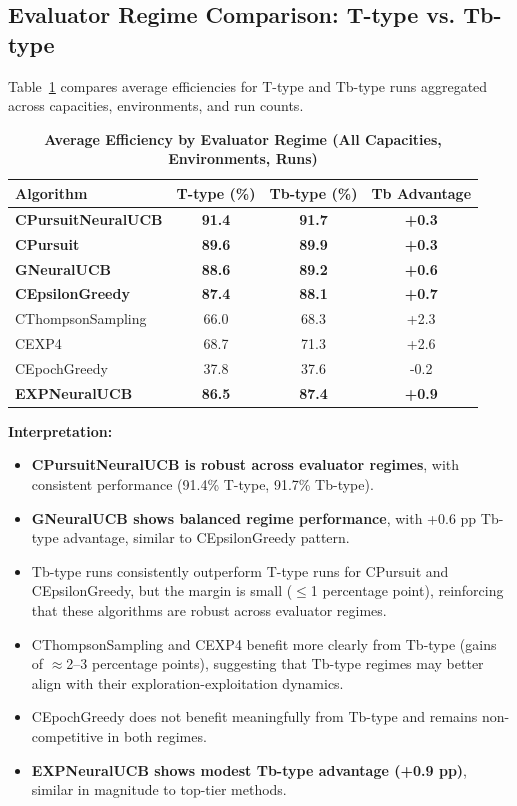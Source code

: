 \documentclass[12pt,a4paper]{article}
\newcommand{\performance}[1]{\textcolor{performancecolor}{\textbf{#1}}}
\newcommand{\legacy}[1]{\textcolor{legacycolor}{\textbf{#1}}}
\newcommand{\neural}[1]{\textcolor{neuralcolor}{\textbf{#1}}}
\begin{document}
\subsection{Evaluator Regime Comparison: T-type vs. Tb-type}

Table~\ref{tab:regime-comparison} compares average efficiencies for T-type and Tb-type runs aggregated across capacities, environments, and run counts.

\begin{table}[H]
\centering
\caption{\performance{Average Efficiency by Evaluator Regime (All Capacities, Environments, Runs)}}
\label{tab:regime-comparison}
\begin{tabular}{|l|c|c|c|}
\hline
\textbf{Algorithm} & \textbf{T-type (\%)} & \textbf{Tb-type (\%)} & \textbf{Tb Advantage} \\
\hline
\hline
\neural{CPursuitNeuralUCB}   & \neural{91.4}     & \neural{91.7}     & \neural{+0.3} \\
\performance{CPursuit}        & \performance{89.6} & \performance{89.9} & \performance{+0.3} \\
\neural{GNeuralUCB}          & \neural{88.6}     & \neural{89.2}     & \neural{+0.6} \\
\performance{CEpsilonGreedy} & \performance{87.4} & \performance{88.1} & \performance{+0.7} \\
CThompsonSampling            & 66.0              & 68.3              & +2.3 \\
CEXP4                        & 68.7              & 71.3              & +2.6 \\
CEpochGreedy                 & 37.8              & 37.6              & -0.2 \\
\legacy{EXPNeuralUCB}        & \legacy{86.5}     & \legacy{87.4}     & \legacy{+0.9} \\
\hline
\end{tabular}
\end{table}

\textbf{Interpretation:}
\begin{itemize}
\item \neural{CPursuitNeuralUCB is robust across evaluator regimes}, with consistent performance (91.4\% T-type, 91.7\% Tb-type).
\item \neural{GNeuralUCB shows balanced regime performance}, with +0.6 pp Tb-type advantage, similar to CEpsilonGreedy pattern.
\item Tb-type runs consistently outperform T-type runs for CPursuit and CEpsilonGreedy, but the margin is small ($\leq$1 percentage point), reinforcing that these algorithms are robust across evaluator regimes.
\item CThompsonSampling and CEXP4 benefit more clearly from Tb-type (gains of $\approx$2–3 percentage points), suggesting that Tb-type regimes may better align with their exploration-exploitation dynamics.
\item CEpochGreedy does not benefit meaningfully from Tb-type and remains non-competitive in both regimes.
\item \legacy{EXPNeuralUCB shows modest Tb-type advantage (+0.9 pp)}, similar in magnitude to top-tier methods.
\end{itemize}
\end{document}
